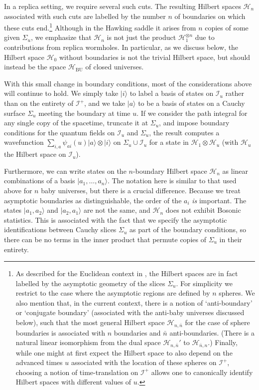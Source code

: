 \documentclass[letterpaper,12pt]{article}
\newcommand*{\hilb}{\mathcal{H}}	%
\newcommand*{\hbu}{\mathcal{H}_\text{BU}} %
\newcommand*{\scri}{\mathscr{I}} %
\begin{document}
In a replica setting, we require several such cuts. The resulting Hilbert spaces $\hilb_{n}$ associated with such cuts are labelled by the number $n$ of boundaries on which these cuts end.\footnote{As described for the Euclidean context in \cite{Marolf:2020xie}, the Hilbert spaces are in fact labelled by the asymptotic geometry of the slices $\Sigma_u$.  For simplicity we restrict to the case where the asymptotic regions are defined by $n$ spheres.  We also mention that, in the current context, there is a notion of `anti-boundary' or `conjugate boundary' (associated with the anti-baby universes discussed below), such that the most general Hilbert space $\hilb_{n,\bar n}$ for the case of sphere boundaries is associated with $n$ boundaries and $\bar n$ anti-boundaries.
(There is a natural linear isomorphism from the dual space $\hilb_{n,\bar{n}}'$ to $\hilb_{\bar{n},n}$.)  Finally, while one might at first expect the Hilbert space to also depend on the advanced times $u$ associated with the location of these spheres on $\scri^+$, choosing a notion of time-translation on $\scri^+$ allows one to canonically identify Hilbert spaces with different values of $u$.} Although in the Hawking saddle it arises from $n$ copies of some given $\Sigma_u$, we emphasize that
 $\hilb_n$ is not just the product $\hilb_1^{\otimes n}$ due to contributions from replica wormholes. %
 In particular, as we discuss below, the Hilbert space $\hilb_0$ without boundaries is not the trivial Hilbert space, but should  instead be the space $\hbu$ of closed universes.

With this small change in boundary conditions, most of the considerations above will continue to hold. We simply take $|i\rangle$ to label a basis of states on $\scri_u$ rather than on the entirety of $\scri^+$, and  we take $|a\rangle$ to be a basis of states on a Cauchy surface $\Sigma_u$ meeting the boundary at time $u$. If we consider the path integral for any single copy of the spacetime, truncate it at $\Sigma_u$, and impose boundary conditions for the quantum fields on $\scri_u$ and $\Sigma_u$, the result computes a wavefunction $\sum_{i,a}\psi_{ai}(u)|a\rangle\otimes |i\rangle$ on $\Sigma_u\cup \scri_u$ for a state in $\hilb_1 \otimes \hilb_u$ (with $\hilb_u$ the Hilbert space on $\scri_u$).

Furthermore, we can write states on the $n$-boundary Hilbert space $\hilb_n$ as linear combinations of a basis $|a_1,\ldots,a_n\rangle$. The notation here is similar to that used above for $n$ baby universes, but there is a crucial difference.  Because we treat asymptotic boundaries as distinguishable, the order of the $a_i$ {\it is} important. The states
$|a_1,a_2\rangle$ and $|a_2,a_1\rangle$ are not the same, and  $\hilb_n$ does not exhibit Bosonic statistics.  This is associated with the fact that
 we specify the asymptotic identifications between Cauchy slices $\Sigma_u$ as part of the boundary conditions, so  there can be no terms in the inner product that permute copies of $\Sigma_u$ in their entirety.
\end{document}
